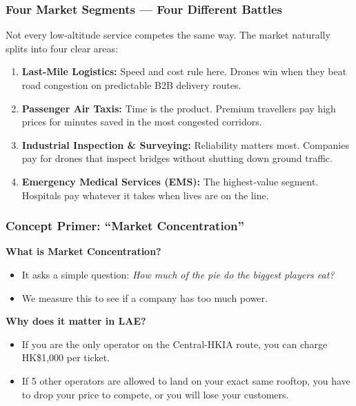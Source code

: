 \documentclass{beamer}
\begin{document}
\begin{frame}[t]
  \frametitle{Four Market Segments — Four Different Battles}
  
  Not every low-altitude service competes the same way. The market naturally splits into four clear areas:

  \begin{enumerate}
    \item \textbf{Last-Mile Logistics:} Speed and cost rule here. Drones win when they beat road congestion on predictable B2B delivery routes.
    \item \textbf{Passenger Air Taxis:} Time is the product. Premium travellers pay high prices for minutes saved in the most congested corridors.
    \item \textbf{Industrial Inspection \& Surveying:} Reliability matters most. Companies pay for drones that inspect bridges without shutting down ground traffic.
    \item \textbf{Emergency Medical Services (EMS):} The highest-value segment. Hospitals pay whatever it takes when lives are on the line.
  \end{enumerate}
\end{frame}

\begin{frame}[t]
  \frametitle{Concept Primer: ``Market Concentration''}
  
  \textbf{What is Market Concentration?}
  \begin{itemize}
      \item It asks a simple question: \textit{How much of the pie do the biggest players eat?}
      \item We measure this to see if a company has too much power.
  \end{itemize}

  \vspace{0.3cm}
  \textbf{Why does it matter in LAE?}
  \begin{itemize}
      \item If you are the only operator on the Central-HKIA route, you can charge HK\$1,000 per ticket. 
      \item If 5 other operators are allowed to land on your exact same rooftop, you have to drop your price to compete, or you will lose your customers.
  \end{itemize}
\end{frame}
\end{document}
